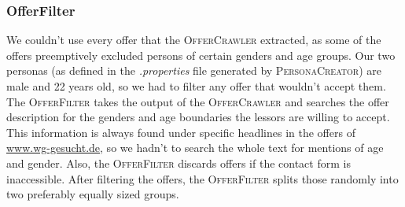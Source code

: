 \documentclass[11pt]{scrartcl}
\begin{document}
\subsubsection{OfferFilter}
\begin{figure}[H]
        \centering
\end{figure}
We couldn't use every offer that the \textsc{OfferCrawler} extracted, as some of the offers preemptively excluded persons of certain genders and age groups. Our two personas (as defined in the \textit{.properties} file generated by \textsc{PersonaCreator}) are male and 22 years old, so we had to filter any offer that wouldn't accept them. The \textsc{OfferFilter} takes the output of the \textsc{OfferCrawler} and searches the offer description for the genders and age boundaries the lessors are willing to accept.           %
This information is always found under specific headlines in the offers of \url{www.wg-gesucht.de}, so we hadn't to search the whole text for mentions of age and gender. Also, the \textsc{OfferFilter} discards offers if the contact form is inaccessible. After filtering the offers, the \textsc{OfferFilter} splits those randomly into two preferably equally sized groups.
\end{document}

